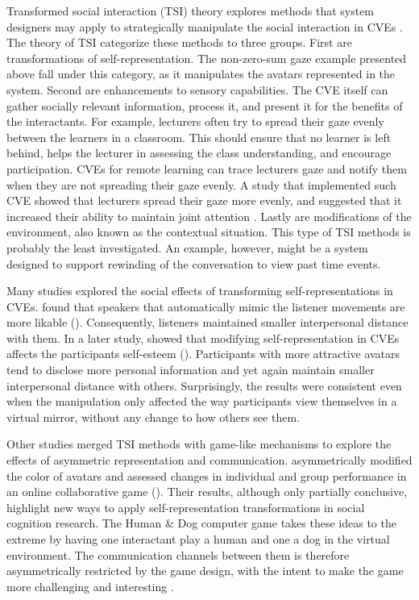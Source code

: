 \documentclass[]{simple-thesis}
\begin{document}
Transformed social interaction (TSI) theory explores methods that system designers may apply to strategically manipulate the social interaction in CVEs \citep{Bailenson2004}.
The theory of TSI categorize these methods to three groups.
First are transformations of self-representation.
The non-zero-sum gaze example presented above fall under this category, as it manipulates the avatars represented in the system.
Second are enhancements to sensory capabilities.
The CVE itself can gather socially relevant information, process it, and present it for the benefits of the interactants.
For example, lecturers often try to spread their gaze evenly between the learners in a classroom.
This should ensure that no learner is left behind, helps the lecturer in assessing the class understanding, and encourage participation.
CVEs for remote learning can trace lecturers gaze and notify them when they are not spreading their gaze evenly.
A study that implemented such CVE showed that lecturers spread their gaze more evenly, and suggested that it increased their ability to maintain joint attention \citep{Bailenson2008b}.
Lastly are modifications of the environment, also known as the contextual situation.
This type of TSI methods is probably the least investigated.
An example, however, might be a system designed to support rewinding of the conversation to view past time events.

Many studies explored the social effects of transforming self-representations in CVEs.
\citeauthor{Bailenson2005} found that speakers that automatically mimic the listener movements are more likable (\citeyear{Bailenson2005}).
Consequently, listeners maintained smaller interpersonal distance with them.
In a later study, \citeauthor{Bailenson2008a} showed that modifying self-representation in CVEs affects the participants self-esteem (\citeyear{Bailenson2008a}).
Participants with more attractive avatars tend to disclose more personal information and yet again maintain smaller interpersonal distance with others.
Surprisingly, the results were consistent even when the manipulation only affected the way participants view themselves in a virtual mirror, without any change to how others see them.

Other studies merged TSI methods with game-like mechanisms to explore the effects of asymmetric representation and communication.
\citeauthor{Dominguez2014} asymmetrically modified the color of avatars and assessed changes in individual and group performance in an online collaborative game (\citeyear{Dominguez2014}).
Their results, although only partially conclusive, highlight new ways to apply self-representation transformations in social cognition research.
The Human \& Dog computer game takes these ideas to the extreme by having one interactant play a human and one a dog in the virtual environment.
The communication channels between them is therefore asymmetrically restricted by the game design, with the intent to make the game more challenging and interesting \citep{Chou2016, Hou2017}.
\end{document}
